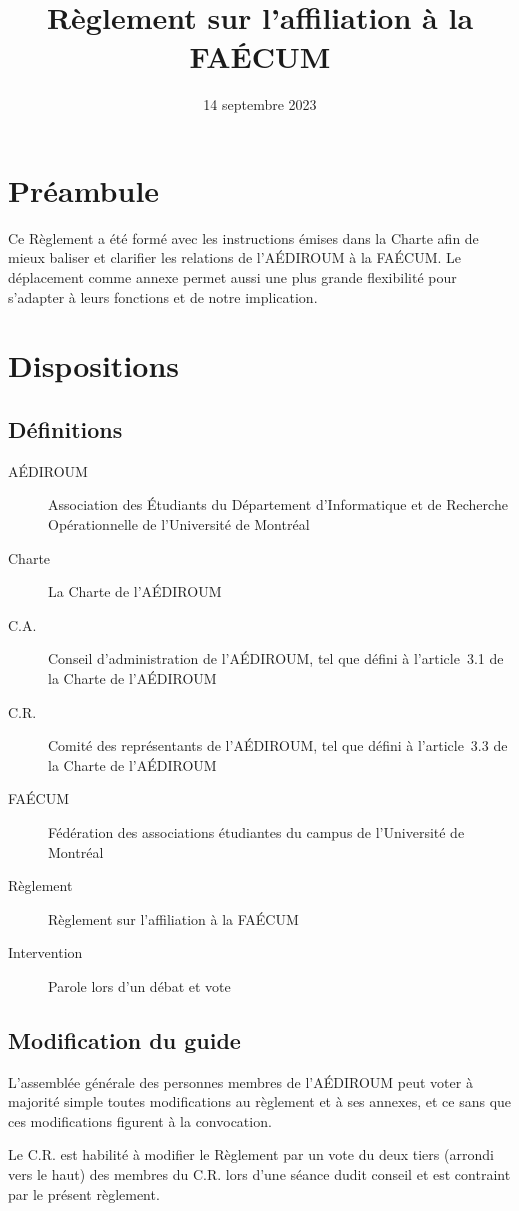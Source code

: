 \documentclass{aediroum}
\title{Règlement sur l'affiliation à la FAÉCUM}
\date{14 septembre 2023}
\begin{document}
\maketitle

\section{Préambule}
Ce Règlement a été formé avec les instructions émises dans la Charte afin de mieux baliser et clarifier les relations de l'AÉDIROUM à la FAÉCUM. Le déplacement comme annexe permet aussi une plus grande flexibilité pour s'adapter à leurs fonctions et de notre implication.

\section{Dispositions}

\subsection{Définitions}
\begin{description}
	\item[AÉDIROUM] Association des Étudiants du Département d'Informatique et de Recherche Opérationnelle de l'Université de Montréal
	\item[Charte] La Charte de l'AÉDIROUM
	\item[C.A.] Conseil d'administration de l'AÉDIROUM, tel que défini à l'article~3.1 de la Charte de l'AÉDIROUM
	\item[C.R.] Comité des représentants de l'AÉDIROUM, tel que défini à l'article~3.3 de la Charte de l'AÉDIROUM
	\item[FAÉCUM] Fédération des associations étudiantes du campus de l'Université de Montréal
	\item[Règlement] Règlement sur l'affiliation à la FAÉCUM
	\item[Intervention] Parole lors d'un débat et vote
\end{description}

\subsection{Modification du guide}
L'assemblée générale des personnes membres de l'AÉDIROUM peut voter à majorité simple toutes modifications au règlement et à ses annexes, et ce sans que ces modifications figurent à la convocation.

Le C.R. est habilité à modifier le Règlement par un vote du deux tiers (arrondi vers le haut) des membres du C.R. lors d'une séance dudit conseil et est contraint par le présent règlement.
\end{document}
